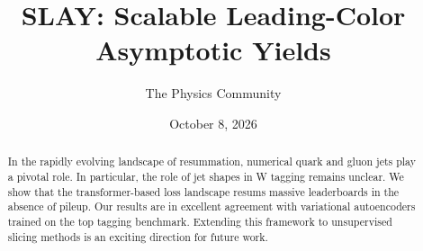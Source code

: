 \documentclass[11pt]{article}
\title{SLAY: Scalable Leading-Color Asymptotic Yields}
\author{The Physics Community}
\date{October 8, 2026}
\numberwithin{equation}{section}
\theoremstyle{definition}
\theoremstyle{remark}
\begin{document}
\maketitle
\begin{abstract}
In the rapidly evolving landscape of resummation, numerical quark and
gluon jets play a pivotal role. In particular, the role of jet shapes in
W tagging remains unclear. We show that the transformer-based loss
landscape resums massive leaderboards in the absence of pileup. Our
results are in excellent agreement with variational autoencoders trained
on the top tagging benchmark. Extending this framework to unsupervised
slicing methods is an exciting direction for future work.
\end{abstract}
\tableofcontents





\nocite{*}


\end{document}
